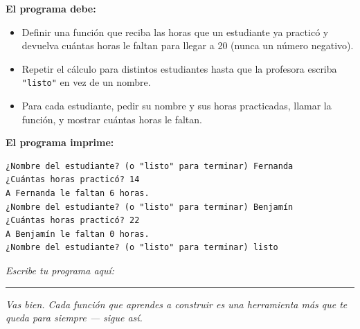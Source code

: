 \documentclass[11pt]{article}
\begin{document}
\textbf{El programa debe:}
\begin{itemize}
  \item Definir una función que reciba las horas que un estudiante ya practicó y devuelva cuántas horas le faltan para llegar a 20 (nunca un número negativo).
  \item Repetir el cálculo para distintos estudiantes hasta que la profesora escriba \texttt{"listo"} en vez de un nombre.
  \item Para cada estudiante, pedir su nombre y sus horas practicadas, llamar la función, y mostrar cuántas horas le faltan.
\end{itemize}
\vspace{1mm}\textbf{El programa imprime:}
\begin{cajacodigo}
\begin{Verbatim}[fontsize=\small]
¿Nombre del estudiante? (o "listo" para terminar) Fernanda
¿Cuántas horas practicó? 14
A Fernanda le faltan 6 horas.
¿Nombre del estudiante? (o "listo" para terminar) Benjamín
¿Cuántas horas practicó? 22
A Benjamín le faltan 0 horas.
¿Nombre del estudiante? (o "listo" para terminar) listo
\end{Verbatim}
\end{cajacodigo}
\vspace{2mm}\textit{Escribe tu programa aquí:}\vspace{1mm}

\begin{cajaescribe}[height=6.0cm]
\end{cajaescribe}

\vspace{1cm}
\begin{center}
\rule{0.6\textwidth}{0.4pt}

\vspace{4mm}
\textit{Vas bien. Cada función que aprendes a construir es una herramienta más que te queda para siempre --- sigue así.}
\end{center}
\end{document}
